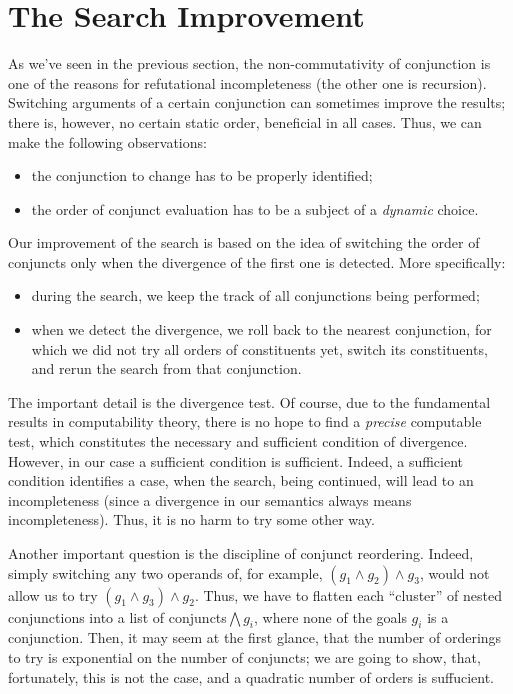 \section{The Search Improvement}
\label{improvement}

As we've seen in the previous section, the non-commutativity of conjunction is one of the reasons for
refutational incompleteness (the other one is recursion). Switching arguments of a certain conjunction
can sometimes improve the results; there is, however, no certain static order,
beneficial in all cases. Thus, we can make the following observations:

\begin{itemize}
\item the conjunction to change has to be properly identified;
\item the order of conjunct evaluation has to be a subject of a \emph{dynamic} choice.
\end{itemize}

Our improvement of the search is based on the idea of switching the order of conjuncts only when
the divergence of the first one is detected. More specifically: 

\begin{itemize}
\item during the search, we keep the track of all conjunctions being performed;
\item when we detect the divergence, we roll back to the nearest conjunction, for which 
we did not try all orders of constituents yet, switch its constituents, and rerun 
the search from that conjunction.
\end{itemize}

The important detail is the divergence test. Of course, due to the fundamental results in computability
theory, there is no hope to find a \emph{precise} computable test, which constitutes the necessary and 
sufficient condition of divergence. However, in our case a sufficient condition is sufficient. Indeed,  
a sufficient condition identifies a case, when the search, being continued, will lead to an incompleteness 
(since a divergence in our semantics always means incompleteness). Thus, it is no harm to try some other way. 

Another important question is the discipline of conjunct reordering. Indeed, simply switching any two operands
of, for example, \mbox{$(g_1\wedge g_2)\wedge g_3$}, would not allow us to try \mbox{$(g_1\wedge g_3)\wedge g_2$}.
Thus, we have to flatten each ``cluster'' of nested conjunctions into a list of conjuncts\mbox{$\bigwedge g_i$}, 
where none of the goals $g_i$ is a conjunction. Then, it may seem at the first glance, that the number of orderings to try 
is exponential on the number of conjuncts; we are going to show, that, fortunately, this is not the case, and
a quadratic number of orders is suffucient.

